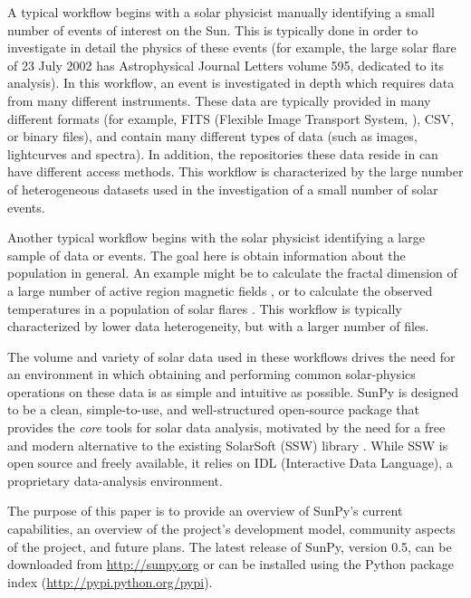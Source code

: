A typical workflow begins with a solar physicist manually identifying
a small number of events of interest on the Sun.  This is typically
done in order to investigate in detail the physics of these events
(for example, the large solar flare of 23 July 2002 has Astrophysical
Journal Letters volume 595, dedicated to its analysis).
In this workflow, an event is investigated in depth which requires 
data from many different instruments.
These data are typically provided in many different formats (for
example, FITS (Flexible Image Transport System, \cite{refId0}), CSV, or
binary files), and contain many different types of data (such as
images, lightcurves and spectra).  In addition, the repositories these data reside
in can have different access methods.  This workflow is characterized
by the large number of heterogeneous datasets used in the
investigation of a small number of solar events.

Another typical workflow begins with the solar physicist identifying a
large sample of data or events.  The goal here is obtain information
about the population in general.  An example might be to calculate the
fractal dimension of a large number of active region magnetic fields
\citep{2005ApJ...631..628M}, or to calculate the observed temperatures
in a population of solar flares \citep{2012ApJS..202...11R}.  This
workflow is typically characterized by lower data heterogeneity, but
with a larger number of files.

The volume and variety of solar data used in these workflows drives
the need for an environment in which obtaining and performing common
solar-physics operations on these data is as simple and intuitive as
possible.  SunPy is designed to be a clean, simple-to-use, and
well-structured open-source package that provides the \textit{core}
tools for solar data analysis, motivated by the need for a free and
modern alternative to the existing SolarSoft (SSW) library
\citep{freeland1998}. While SSW is open source and freely available,
it relies on IDL (Interactive Data Language), a proprietary
data-analysis environment.

The purpose of this paper is to provide an overview of SunPy's current
capabilities, an overview of the project's development model, community aspects of the
project, and future plans. The latest release of SunPy, version 0.5,
can be downloaded from \url{http://sunpy.org} or can be
installed using the Python package index (\url{http://pypi.python.org/pypi}).
